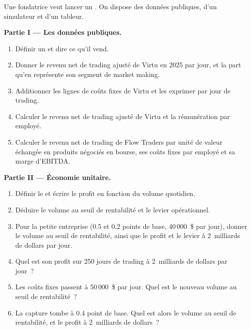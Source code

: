 \begin{problem}\label{pb:hf:the-business-of-market-making:1}
Une fondatrice veut lancer un . On dispose des données publiques, d'un simulateur et d'un tableur.

\medskip\noindent\textbf{Partie I --- Les données publiques.}
\begin{enumerate}
\item Définir un  et dire ce qu'il vend.
\item Donner le revenu net de trading ajusté de Virtu en 2025 par jour, et la part qu'en représente son segment de market making.
\item Additionner les lignes de coûts fixes de Virtu et les exprimer par jour de trading.
\item Calculer le revenu net de trading ajusté de Virtu et la rémunération par employé.
\item Calculer le revenu net de trading de Flow Traders par unité de valeur échangée en produits négociés en bourse, ses coûts fixes par employé et sa marge d'EBITDA.
\end{enumerate}

\medskip\noindent\textbf{Partie II --- Économie unitaire.}
\begin{enumerate}[resume]
\item Définir le  et écrire le profit en fonction du volume quotidien.
\item Déduire le volume au seuil de rentabilité et le levier opérationnel.
\item Pour la petite entreprise (0.5 et 0.2 points de base, 40\,000~\$ par jour), donner le volume au seuil de rentabilité, ainsi que le profit et le levier à 2~milliards de dollars par jour.
\item Quel est son profit sur 250 jours de trading à 2~milliards de dollars par jour~?
\item Les coûts fixes passent à 50\,000~\$ par jour. Quel est le nouveau volume au seuil de rentabilité~?
\item La capture tombe à 0.4 point de base. Quel est alors le volume au seuil de rentabilité, et le profit à 2~milliards de dollars~?
\end{enumerate}


\end{problem}
